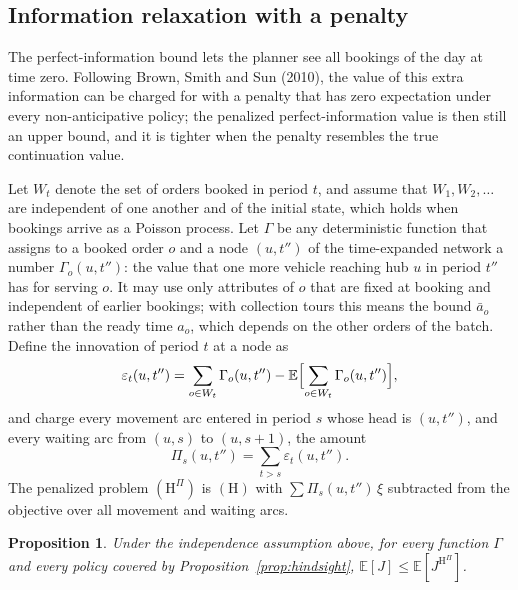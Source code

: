 \documentclass[12pt]{article}
\theoremstyle{plain}
\newtheorem{proposition}{Proposition}
\theoremstyle{definition}
\begin{document}
\subsection{Information relaxation with a penalty}\label{sec:penalty}

The perfect-information bound lets the planner see all bookings of the day at time zero. Following Brown, Smith and Sun (2010), the value of this extra information can be charged for with a penalty that has zero expectation under every non-anticipative policy; the penalized perfect-information value is then still an upper bound, and it is tighter when the penalty resembles the true continuation value.

Let $W_t$ denote the set of orders booked in period $t$, and assume that $W_1,W_2,\dots$ are independent of one another and of the initial state, which holds when bookings arrive as a Poisson process. Let $\Gamma$ be any deterministic function that assigns to a booked order $o$ and a node $(u,t'')$ of the time-expanded network a number $\Gamma_o(u,t'')$: the value that one more vehicle reaching hub $u$ in period $t''$ has for serving $o$. It may use only attributes of $o$ that are fixed at booking and independent of earlier bookings; with collection tours this means the bound $\bar a_o$ rather than the ready time $a_o$, which depends on the other orders of the batch. Define the innovation of period $t$ at a node as
\begin{equation}\label{eq:innov}
\varepsilon_t(u,t'')=\sum_{o\in W_t}\Gamma_o(u,t'')-\mathbb{E}\Bigl[\sum_{o\in W_t}\Gamma_o(u,t'')\Bigr],
\end{equation}
and charge every movement arc entered in period $s$ whose head is $(u,t'')$, and every waiting arc from $(u,s)$ to $(u,s+1)$, the amount
\begin{equation}\label{eq:penalty}
\Pi_{s}(u,t'')=\sum_{t>s}\varepsilon_t(u,t'') .
\end{equation}
The penalized problem $(\mathrm{H}^{\Pi})$ is $(\mathrm{H})$ with $\sum\Pi_s(u,t'')\,\xi$ subtracted from the objective over all movement and waiting arcs.

\begin{proposition}\label{prop:penalty}
Under the independence assumption above, for every function $\Gamma$ and every policy covered by Proposition~\ref{prop:hindsight}, $\mathbb{E}[J]\le\mathbb{E}[J^{\mathrm{H}^{\Pi}}]$.
\end{proposition}
\end{document}
